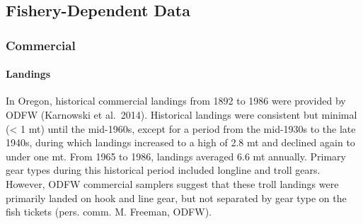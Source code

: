 \documentclass[11pt,
  english,
  a4paper,
]{article}
\begin{document}
\hypertarget{fishery-dependent-data}{%
\subsection{Fishery-Dependent Data}\label{fishery-dependent-data}}

\leavevmode\tagmcend\tagstructend


\hypertarget{commercial}{%
\subsubsection{Commercial}\label{commercial}}

\leavevmode\tagmcend\tagstructend


\hypertarget{landings-1}{%
\paragraph{Landings}\label{landings-1}}

\leavevmode\tagmcend\tagstructend


In Oregon, historical commercial landings from 1892 to 1986 were provided by ODFW (Karnowski et al.~2014). Historical landings were consistent but minimal (\textless{} 1 mt) until the mid-1960s, except for a period from the mid-1930s to the late 1940s, during which landings increased to a high of 2.8 mt and declined again to under one mt. From 1965 to 1986, landings averaged 6.6 mt annually. Primary gear types during this historical period included longline and troll gears. However, ODFW commercial samplers suggest that these troll landings were primarily landed on hook and line gear, but not separated by gear type on the fish tickets (pers. comm. M. Freeman, ODFW).

\leavevmode\tagmcend\tagstructend\par

\end{document}
